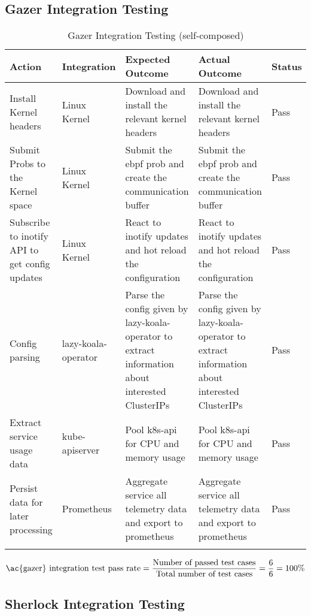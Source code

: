 
\subsection{Gazer Integration Testing}

\begin{longtable}{|p{30mm}|p{21mm}|p{40mm}|p{40mm}|p{10mm}|}
    \hline
    \textbf{Action} &
      \textbf{Integration} &
      \textbf{Expected Outcome} &
      \textbf{Actual Outcome} &
      \textbf{Status} \\ \hline
    Install Kernel headers &
      Linux Kernel &
      Download and install the relevant kernel headers &
      Download and install the relevant kernel headers &
      Pass \\ \hline
    Submit Probs to the Kernel space &
      Linux Kernel &
      Submit the \ac{ebpf} prob and create the communication buffer &
      Submit the \ac{ebpf} prob and create the communication buffer &
      Pass \\ \hline
    Subscribe to inotify API to get config updates &
      Linux Kernel &
      React to inotify updates and hot reload the configuration &
      React to inotify updates and hot reload the configuration &
      Pass \\ \hline
    Config parsing &
      \ac{lazy-koala-operator} &
      Parse the config given by \ac{lazy-koala-operator} to extract information about interested ClusterIPs &
      Parse the config given by \ac{lazy-koala-operator} to extract information about interested ClusterIPs &
      Pass \\ \hline
    Extract service usage data &
      kube-apiserver &
      Pool k8s-api for CPU and memory usage &
      Pool k8s-api for CPU and memory usage &
      Pass \\ \hline
    Persist data for later processing &
      Prometheus &
      Aggregate service all telemetry data and export to prometheus &
      Aggregate service all telemetry data and export to prometheus &
      Pass \\ \hline
    \caption{Gazer Integration Testing (self-composed)}
\end{longtable}

\begingroup
\setlength{\abovedisplayskip}{-0.5cm}
\[
\text{\ac{gazer} integration test pass rate} = \frac{\text{Number of passed test cases}}{\text{Total number of test cases}} = \frac{6}{6} = 100\%
\]
\endgroup

\subsection{Sherlock Integration Testing}

